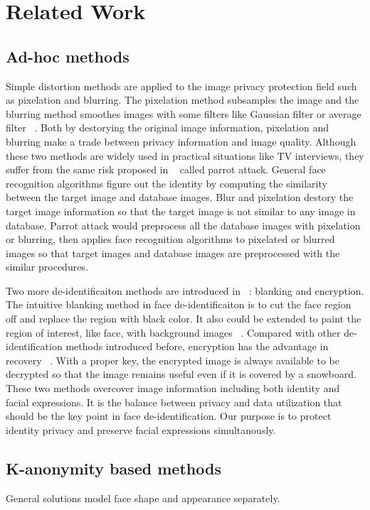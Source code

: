 \chapter{Related Work}

\section{Ad-hoc methods}
	Simple distortion methods are applied to the image privacy protection field such as pixelation and blurring. The pixelation method subsamples the image and the blurring method smoothes images with some filters like Gaussian filter or average filter ~\cite{Agrawal09,Boyle00}. Both by destorying the original image information, pixelation and blurring make a trade between privacy information and image quality. Although these two methods are widely used in practical situations like TV interviews, they suffer from the same risk proposed in ~\cite{Newton05} called parrot attack. General face recognition algorithms figure out the identity by computing the similarity between the target image and database images. Blur and pixelation destory the target image information so that the target image is not similar to any image in database. Parrot attack would preprocess all the database images with pixelation or blurring, then applies face recognition algorithms to pixelated or blurred images so that target images and database images are preprocessed with the similar procedures. 

	\par
	Two more de-identificaiton methods are introduced in ~\cite{Winkler14}: blanking and encryption. The intuitive blanking method in face de-identificaiton is to cut the face region off and replace the region with black color. It also could be extended to paint the region of interest, like face, with background images  ~\cite{inpaint09,Qureshi09}. Compared with other de-identification methods introduced before, encryption has the advantage in recovery ~\cite{Boult05}. With a proper key, the encrypted image is always available to be decrypted so that the image remains useful even if it is covered by a snowboard. These two methods overcover image information including both identity and facial expressions. It is the balance between privacy and data utilization that should be the key point in face de-identification. Our purpose is to protect identity privacy and preserve facial expressions simultanously.  

\section{K-anonymity based methods}

	General solutions model face shape and appearance separately. 